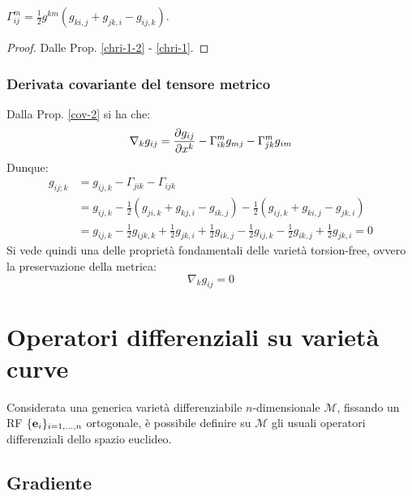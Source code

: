 \begin{proposition}
	$ \Gamma^m_{ij} = \frac{1}{2} g^{km} \left( g_{ki,j} + g_{jk,i} - g_{ij,k} \right) $.
\end{proposition}
\begin{proof}
	Dalle Prop. \ref{chri-1-2} - \ref{chri-1}.
\end{proof}

\subsubsection{Derivata covariante del tensore metrico}

Dalla Prop. \ref{cov-2} si ha che:
\begin{equation}
	\nabla_k g_{ij} = \frac{\partial g_{ij}}{\partial x^k} - \Gamma^m_{ik} g_{mj} - \Gamma^m_{jk} g_{im}
	\label{eq:4.15}
\end{equation}
Dunque:
\begin{equation*}
	\begin{split}
		g_{ij;k}
		&= g_{ij,k} - \Gamma_{jik} - \Gamma_{ijk}\\
		&= g_{ij,k} - \frac{1}{2} \left( g_{ji,k} + g_{kj,i} - g_{ik,j} \right) - \frac{1}{2} \left( g_{ij,k} + g_{ki,j} - g_{jk,i} \right)\\
		&= g_{ij,k} - \frac{1}{2} g_{ijk,k} + \frac{1}{2} g_{jk,i} + \frac{1}{2} g_{ik,j} - \frac{1}{2} g_{ij,k} - \frac{1}{2} g_{ik,j} + \frac{1}{2} g_{jk,i} = 0
	\end{split}
\end{equation*}
Si vede quindi una delle proprietà fondamentali delle varietà torsion-free, ovvero la preservazione della metrica:
\begin{equation}
	\nabla_k g_{ij} = 0
	\label{eq:4.16}
\end{equation}

\section{Operatori differenziali su varietà curve}

Considerata una generica varietà differenziabile $ n $-dimensionale $ \mathcal{M} $, fissando un RF $ \{\mathbf{e}_i\}_{i = 1, \dots, n} $ ortogonale, è possibile definire su $ \mathcal{M} $ gli usuali operatori differenziali dello spazio euclideo.

\subsection{Gradiente}

